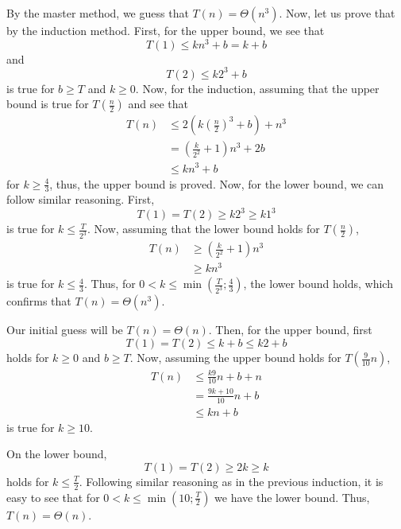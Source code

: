 \documentclass[a4paper]{report}
\begin{document}
By the master method, we guess that $T\left( n \right) = \Theta\left( n^3 \right) $. Now, let us prove that by the induction method. First, for the upper bound, we see that \[
T\left( 1 \right) \le k n^3 + b = k + b
\] and \[
T\left( 2 \right) \le k 2^3 + b
\] is true for $b\ge T$ and $k\ge 0$. Now, for the induction, assuming that the upper bound is true for $T\left( \frac{n}{2} \right) $ and see that
\begin{align*}
    T\left( n \right) &\le 2\left( k\left( \frac{n}{2} \right) ^3 + b \right) +n^3 \\
    &= \left( \frac{k}{2^2}+1 \right) n^3 + 2b \\
    &\le k n^3 + b
\end{align*}
for $k \ge \frac{4}{3}$, thus, the upper bound is proved. Now, for the lower bound, we can follow similar reasoning. First, \[
T\left( 1 \right) = T\left( 2 \right) \ge k 2^3 \ge k 1^3
\] is true for $k \le \frac{T}{2^3}$. Now, assuming that the lower bound holds for $T\left( \frac{n}{2} \right) $,
\begin{align*}
    T\left( n \right) &\ge \left( \frac{k}{2^2}+1 \right) n^3 \\
    &\ge k n^3
\end{align*}
is true for $k \le \frac{4}{3}$. Thus, for $0<k\le \min \left( \frac{T}{2^3};\frac{4}{3} \right) $, the lower bound holds, which confirms that $T\left( n \right) = \Theta\left( n^3 \right) $.


Our initial guess will be $T\left( n \right) = \Theta\left( n \right) $. Then, for the upper bound, first \[
T\left( 1 \right) = T\left( 2 \right) \le k + b \le k2 + b
\] holds for $k\ge 0$ and $b\ge T$. Now, assuming the upper bound holds for $T\left( \frac{9}{10}n \right) $,
\begin{align*}
    T\left( n \right) &\le \frac{k9}{10}n + b + n \\
    &= \frac{9k + 10}{10}n + b \\
    &\le kn + b
\end{align*}
is true for $k\ge 10$.

On the lower bound, \[
T\left( 1 \right)  = T\left( 2 \right) \ge 2k \ge k
\] holds for $k\le \frac{T}{2}$. Following similar reasoning as in the previous induction, it is easy to see that for $0<k\le \min\left( 10; \frac{T}{2} \right) $ we have the lower bound. Thus, $T\left( n \right) = \Theta\left( n \right) $.

\end{document}
